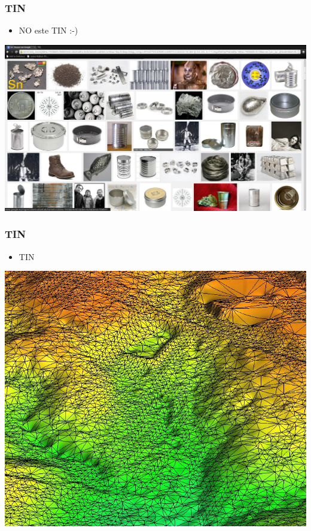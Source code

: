 \begin{frame}
  \frametitle{TIN}
  \begin{itemize}
    \item \alert{NO} este TIN :-)
  \end{itemize}
  \begin{center}
        \includegraphics[height=0.60\textheight]{images/estano}
  \end{center}
\end{frame}
\begin{frame}
  \frametitle{TIN}
  \begin{itemize}
    \item TIN
  \end{itemize}
  \begin{center}
        \includegraphics[height=0.60\textheight]{images/tin_dem}
  \end{center}
\end{frame}
